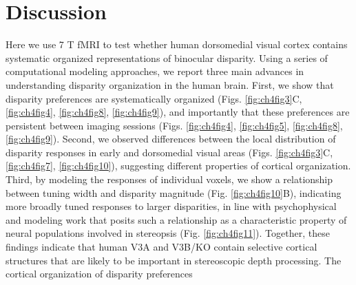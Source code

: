 \section{Discussion}
Here we use 7 T fMRI to test whether human dorsomedial visual cortex contains systematic organized representations of binocular disparity. Using a series of computational modeling approaches, we report three main advances in understanding disparity organization in the human brain. First, we show that disparity preferences are systematically organized (Figs. \ref{fig:ch4fig3}C, \ref{fig:ch4fig4}, \ref{fig:ch4fig8}, \ref{fig:ch4fig9}), and importantly that these preferences are persistent between imaging sessions (Figs. \ref{fig:ch4fig4}, \ref{fig:ch4fig5}, \ref{fig:ch4fig8}, \ref{fig:ch4fig9}). Second, we observed differences between the local distribution of disparity responses in early and dorsomedial visual areas (Figs. \ref{fig:ch4fig3}C, \ref{fig:ch4fig7}, \ref{fig:ch4fig10}), suggesting different properties of cortical organization. Third, by modeling the responses of individual voxels, we show a relationship between tuning width and disparity magnitude (Fig. \ref{fig:ch4fig10}B), indicating more broadly tuned responses to larger disparities, in line with psychophysical and modeling work that posits such a relationship as a characteristic property of neural populations involved in stereopsis (Fig. \ref{fig:ch4fig11}). Together, these findings indicate that human V3A and V3B/KO contain selective cortical structures that are likely to be important in stereoscopic depth processing.
The cortical organization of disparity preferences
